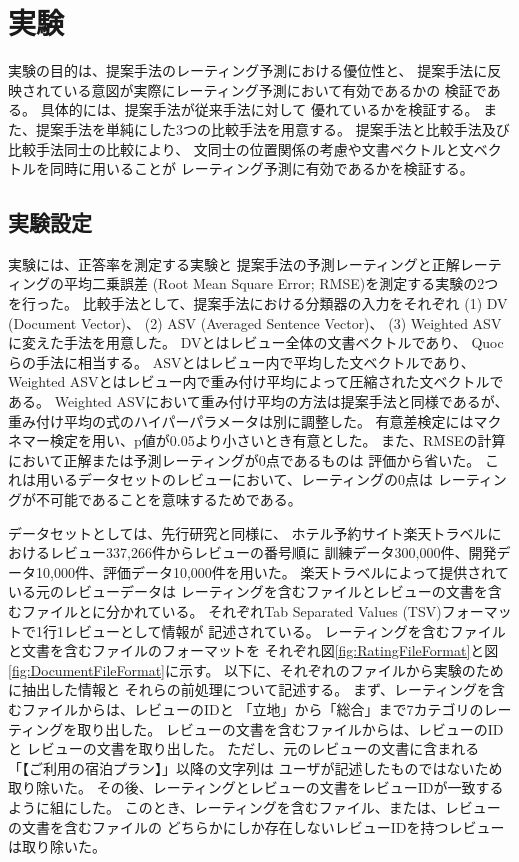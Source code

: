 \section{実験} \label{sec:Experiments}

実験の目的は、提案手法のレーティング予測における優位性と、
提案手法に反映されている意図が実際にレーティング予測において有効であるかの
検証である。
具体的には、提案手法が従来手法\cite{fujitani15}に対して
優れているかを検証する。
また、提案手法を単純にした3つの比較手法を用意する。
提案手法と比較手法及び比較手法同士の比較により、
文同士の位置関係の考慮や文書ベクトルと文ベクトルを同時に用いることが
レーティング予測に有効であるかを検証する。


\subsection{実験設定}

実験には、正答率を測定する実験と
提案手法の予測レーティングと正解レーティングの平均二乗誤差
(Root Mean Square Error; RMSE)を測定する実験の2つを行った。
比較手法として、提案手法における分類器の入力をそれぞれ
(1) DV (Document Vector)、
(2) ASV (Averaged Sentence Vector)、
(3) Weighted ASV
に変えた手法を用意した。
DVとはレビュー全体の文書ベクトルであり、
Quocら\cite{quoc14}の手法に相当する。
ASVとはレビュー内で平均した文ベクトルであり、
Weighted ASVとはレビュー内で重み付け平均によって圧縮された文ベクトルである。
Weighted ASVにおいて重み付け平均の方法は提案手法と同様であるが、
重み付け平均の式のハイパーパラメータは別に調整した。
有意差検定にはマクネマー検定を用い、p値が0.05より小さいとき有意とした。
また、RMSEの計算において正解または予測レーティングが0点であるものは
評価から省いた。
これは用いるデータセットのレビューにおいて、レーティングの0点は
レーティングが不可能であることを意味するためである。

データセットとしては、先行研究\cite{fujitani15}と同様に、
ホテル予約サイト楽天トラベルにおけるレビュー337,266件からレビューの番号順に
訓練データ300,000件、開発データ10,000件、評価データ10,000件を用いた。
楽天トラベルによって提供されている元のレビューデータは
レーティングを含むファイルとレビューの文書を含むファイルとに分かれている。
それぞれTab Separated Values (TSV)フォーマットで1行1レビューとして情報が
記述されている。
レーティングを含むファイルと文書を含むファイルのフォーマットを
それぞれ図\ref{fig:RatingFileFormat}と図\ref{fig:DocumentFileFormat}に示す。
以下に、それぞれのファイルから実験のために抽出した情報と
それらの前処理について記述する。
まず、レーティングを含むファイルからは、レビューのIDと
「立地」から「総合」まで7カテゴリのレーティングを取り出した。
レビューの文書を含むファイルからは、レビューのIDと
レビューの文書を取り出した。
ただし、元のレビューの文書に含まれる「【ご利用の宿泊プラン】」以降の文字列は
ユーザが記述したものではないため取り除いた。
その後、レーティングとレビューの文書をレビューIDが一致するように組にした。
このとき、レーティングを含むファイル、または、レビューの文書を含むファイルの
どちらかにしか存在しないレビューIDを持つレビューは取り除いた。

